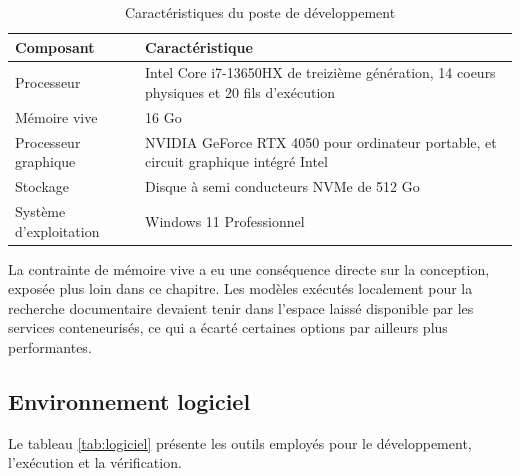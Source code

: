 \begin{table}[H]
\centering
\renewcommand{\arraystretch}{1.25}
\begin{tabular}{|p{4.2cm}|p{10.3cm}|}
\hline
\textbf{Composant} & \textbf{Caractéristique} \\
\hline
Processeur & Intel Core i7-13650HX de treizième génération, 14 coeurs physiques et 20 fils d'exécution \\
\hline
Mémoire vive & 16 Go \\
\hline
Processeur graphique & NVIDIA GeForce RTX 4050 pour ordinateur portable, et circuit graphique intégré Intel \\
\hline
Stockage & Disque à semi conducteurs NVMe de 512 Go \\
\hline
Système d'exploitation & Windows 11 Professionnel \\
\hline
\end{tabular}
\caption{Caractéristiques du poste de développement}
\label{tab:materiel}
\end{table}

La contrainte de mémoire vive a eu une conséquence directe sur la conception, exposée plus loin dans ce chapitre. Les modèles exécutés localement pour la recherche documentaire devaient tenir dans l'espace laissé disponible par les services conteneurisés, ce qui a écarté certaines options par ailleurs plus performantes.

\subsection{Environnement logiciel}

Le tableau \ref{tab:logiciel} présente les outils employés pour le développement, l'exécution et la vérification.

